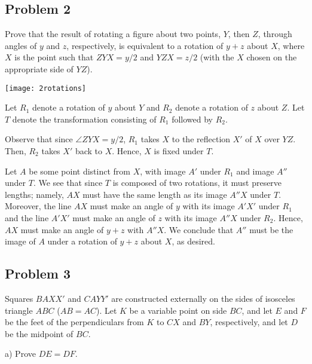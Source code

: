 \subsection{Problem 2}

Prove that the result of rotating a figure about two points, $ Y$, then $ Z$, through angles of $ y$ and $ z$, respectively, is equivalent to a rotation of $ y + z$ about $ X$, where $ X$ is the point such that $ ZYX = y/2$ and $ YZX = z/2$ (with the $ X$ chosen on the appropriate side of $ YZ$).

\begin{center}
\texttt{[image: 2rotations]}
\end{center}

\begin{mdsoln}
Let $ R_1$ denote a rotation of $ y$ about $ Y$ and $ R_2$ denote a rotation of $ z$ about $ Z$. Let $ T$ denote the transformation consisting of $ R_1$ followed by $ R_2$.

Observe that since $ \angle ZYX=y/2$, $ R_1$ takes $ X$ to the reflection $ X'$ of $ X$ over $ YZ$. Then, $ R_2$ takes $ X'$ back to $ X$. Hence, $ X$ is fixed under $ T$.

Let $ A$ be some point distinct from $ X$, with image $ A'$ under $ R_1$ and image $ A''$ under $ T$. We see that since $ T$ is composed of two rotations, it must preserve lengths; namely, $ AX$ must have the same length as its image $ A''X$ under $ T$. Moreover, the line $ AX$ must make an angle of $ y$ with its image $ A'X'$ under $ R_1$ and the line $ A'X'$ must make an angle of $ z$ with its image $ A''X$ under $ R_2$. Hence, $ AX$ must make an angle of $ y+z$ with $ A''X$. We conclude that $ A''$ must be the image of $ A$ under a rotation of $ y+z$ about $ X$, as desired.    
\end{mdsoln}

\subsection{Problem 3}

Squares $ BAXX'$ and $ CAYY'$ are constructed externally on the sides of isosceles triangle $ ABC$ ($ AB = AC$). Let $K$ be a variable point on side $BC$, and let $ E$ and $ F$ be the feet of the perpendiculars from $ K$ to $ CX$ and $ BY$, respectively, and let $ D$ be the midpoint of $ BC$.

a) Prove $ DE = DF$.

